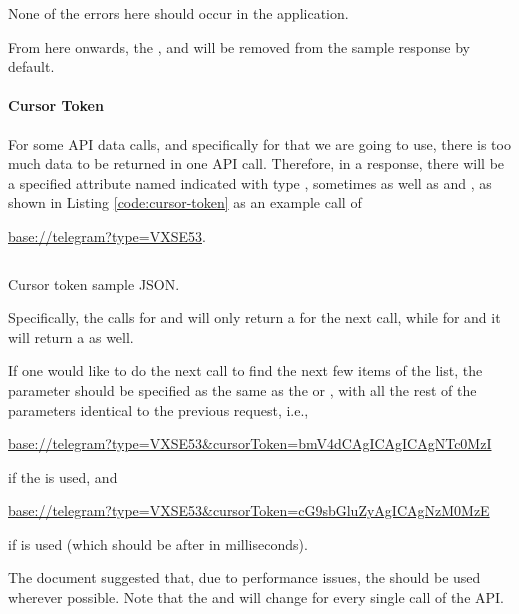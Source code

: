 None of the errors here should occur in the application.

From here onwards, the ,  and  will be removed from the sample response by default.

\paragraph{Cursor Token}

For some API data calls, and specifically for  that we are going to use, there is too much data to be returned in one API call. Therefore, in a response, there will be a specified attribute named  indicated with type , sometimes as well as  and , as shown in Listing \ref{code:cursor-token} as an example call of
\begin{center}
    \url{base://telegram?type=VXSE53}.
\end{center}

\begin{listing}[htp]
    \inputminted{json}{code/CursorToken.json}
    \caption{Cursor token sample JSON.}
    \label{code:cursor-token}
\end{listing}

Specifically, the calls for  and  will only return a  for the next call, while for  and  it will return a  as well.

If one would like to do the next call to find the next few items of the list, the  parameter should be specified as the same as the  or , with all the rest of the parameters identical to the previous request, i.e.,
\begin{center}
    \url{base://telegram?type=VXSE53&cursorToken=bmV4dCAgICAgICAgNTc0MzI}
\end{center}
if the  is used, and
\begin{center}
    \url{base://telegram?type=VXSE53&cursorToken=cG9sbGluZyAgICAgNzM0MzE}
\end{center}
if  is used (which should be after  in milliseconds).

The document suggested that, due to performance issues, the  should be used wherever possible. Note that the  and  will change for every single call of the API.

